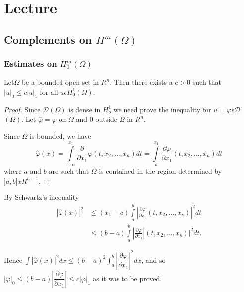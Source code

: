 
\chapter{Lecture}\label{lec8}%

\setcounter{section}{3}
\section{Complements on \texorpdfstring{$H^m(\Omega)$}{Hm(Omega)}}\label{lec8:sec4} %

\subsection{Estimates on \texorpdfstring{$H^m_0(\Omega)$}{Hm0(Omega)}}\label{lec8:sec4:subsec1}

\begin{theorem}\label{lec8:sec4:subsec1:thm4.1}%
  Let\pageoriginale $\Omega$ be a bounded open set in $R^n$. Then there exists a $c
  >0$  such that $|u|_0\le c |u|_1$ for all $u \epsilon
  H^1_0(\Omega)$. 
\end{theorem}

\begin{proof}%
  Since $\mathscr{D}(\Omega)$ is dense in $H^1_o$ we need prove the
  inequality for $u = \varphi \epsilon \mathscr{D}$ $(\Omega)$. Let
  $\overset{\sim}{\varphi} = \varphi$ on $\Omega$ and $0$ outside
  $\Omega$ in $R^n$. 
  
  Since $\Omega$ is bounded, we have
  $$
  \overset{\sim}{\varphi}(x) = \int\limits_{-\infty}^{x_1}
  \frac{\partial}{\partial x_1} \varphi (t, x_2, \ldots , x_n) dt =
  \int\limits_{a}^{x_1} \frac{\partial \varphi }{\partial x_1} (t, x_2,
  \ldots , x_n) dt 
  $$
  where $a$ and $b$ are such that $\Omega$ is contained in the region
  determined by\break $]a, b[x R^{n-1}$. 
\end{proof}

By Schwartz's inequality
\begin{align*}
|\overset{\sim}{\varphi}(x)|^2  & \le (x_1 - a) \int\limits_a^b
|\frac{\partial \varphi}{\partial x_1}(t, x_2, \ldots , x_n)|^2 dt\\ 
& \le (b-a) \int\limits_a^b |\frac{\partial \varphi} {\partial x_1}
|(t, x_2, \ldots , x_n)|^2 dt. 
\end{align*}

Hence $\int |\overset{\sim}{\varphi}(x)|^2 dx \le (b-a)^2 \int_a^b
|\dfrac{\partial \varphi}{\partial x_1}|^2 dx$, and so $|\varphi|_0
\le (b-a) |\dfrac{\partial \varphi}{\partial x_1}|\le c |\varphi|_1$
as it was to be proved. 


